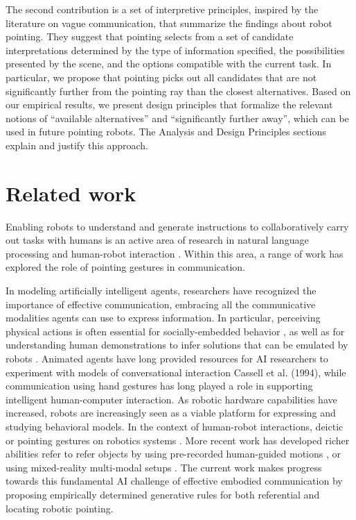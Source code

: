 \documentclass[letterpaper]{article} %
\begin{document}
The second contribution is a set of interpretive principles, inspired by the literature on vague communication, that summarize the findings about robot pointing.  They suggest that pointing selects from a set of candidate interpretations determined by the type of information specified, the possibilities presented by the scene, and the options compatible with the current task.  In particular, we propose that pointing picks out all candidates that are not significantly further from the pointing ray than the closest alternatives.  Based on our empirical results, we present design principles that formalize the relevant notions of ``available alternatives'' and ``significantly further away'', which can be used in future pointing robots.  The Analysis and Design Principles sections explain and justify this approach.


\section{Related work}
\label{related-work}

Enabling robots to understand and generate instructions to collaboratively carry out tasks with humans is an active area of research in natural language processing and human-robot interaction \cite{butepage2017human,cha2018survey}.  Within this area, a range of work has explored the role of pointing gestures in communication.


In modeling artificially intelligent agents, researchers have recognized the importance of effective communication, embracing all the communicative modalities agents can use to express information. In particular, perceiving physical actions \cite{thibadeau1986artificial} is often essential for socially-embedded behavior \cite{dautenhahn2002embodied}, as well as for understanding human demonstrations to infer solutions that can be emulated by robots \cite{kuniyoshi1994learning}. Animated agents have long provided resources for AI researchers to experiment with models of conversational interaction Cassell et al. (1994)\cite{cassell:siggraph1994}, while communication using hand gestures \cite{pavlovic1997visual} has long played a role in supporting intelligent human-computer interaction.
As robotic hardware capabilities have increased, robots are increasingly seen as a viable platform \cite{scassellati2000investigating} for expressing and studying behavioral models. In the context of human-robot interactions, deictic or pointing gestures on robotics systems \cite{pook1996deictic}.  More recent work has developed richer abilities refer to refer objects by using pre-recorded human-guided motions \cite{sauppe2014robot}, or using mixed-reality multi-modal setups \cite{williams2019mixed}. The current work makes progress towards this fundamental AI challenge of effective embodied communication by proposing empirically determined generative rules for both referential and locating robotic pointing.
\end{document}
